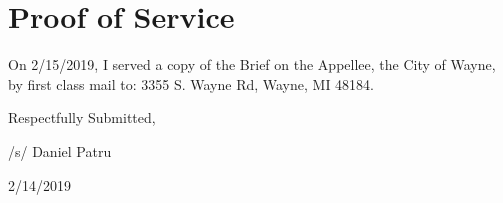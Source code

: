 \documentclass[12pt,\documentclassflag]{michiganCourtOfAppealsBrief}
\begin{document}
\section{Proof of Service}

On 2/15/2019, I served a copy of the Brief on the Appellee, the City of Wayne, by first class mail to: 3355 S. Wayne Rd, Wayne, MI 48184. 

\vspace{1\baselineskip}

{ \setlength{\leftskip}{3.5in}

  Respectfully Submitted,

  /s/ Daniel Patru

  2/14/2019

  \setlength{\leftskip}{0pt}}

\newpage\empty%
\end{document}
